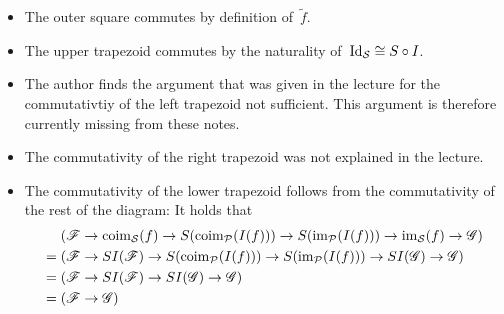 \begin{example}
\begin{enumerate}[resume]
\begin{itemize}
        \item
          The outer square commutes by definition of~$\tilde{f}$.
        \item
          The upper trapezoid commutes by the naturality of~$\mathrm{Id}_{\mathcal{S}} \cong S \circ I$.
        \item
          The author finds the argument that was given in the lecture for the commutativtiy of the left trapezoid not sufficient.
          This argument is therefore currently missing from these notes.
        \item
          The commutativity of the right trapezoid was not explained in the lecture.
        \item
          The commutativity of the lower trapezoid follows from the commutativity of the rest of the diagram:
          It holds that
          \begin{align*}
               {}&  (
                          \Fs
                      \to \coim_\Scat(f)
                      \to S(\coim_\Pcat(I(f)))
                      \to S(\im_\Pcat(I(f)))
                      \to \im_\Scat(f)
                      \to \Gs
                    ) \\
              ={}&  (
                          \Fs
                      \to SI(\Fs)
                      \to S(\coim_\Pcat(I(f)))
                      \to S(\im_\Pcat(I(f)))
                      \to SI(\Gs)
                      \to \Gs
                    ) \\
              ={}&  (
                          \Fs
                      \to SI(\Fs)
                      \to SI(\Gs)
                      \to \Gs
                    ) \\
              ={}&  (
                          \Fs
                      \to \Gs
                    )  \\

\end{align*}
\end{itemize}
\end{enumerate}
\end{example}

